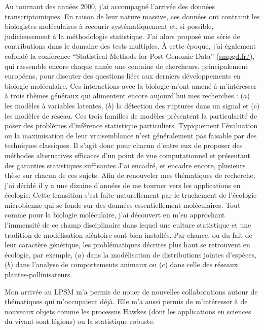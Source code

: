 Au tournant des années 2000, j'ai accompagné l'arrivée des données transcriptomiques. En raison de leur nature massive, ces données ont contraint les biologistes moléculaires à recourir systématiquement et, si possible, judicieusement à la méthodologie statistique. J'ai alors proposé une série de contributions dans le domaine des tests multiples. À cette époque, j'ai également cofondé la conférence “Statistical Methods for Post Genomic Data” (\url{smpgd.fr/}), qui rassemble encore chaque année une centaine de chercheurs, principalement européens, pour discuter des questions liées aux derniers développements en biologie moléculaire.
Ces interactions avec la biologie m'ont amené à m'intéresser à trois thèmes généraux qui alimentent encore aujourd'hui mes recherches : ($a$) les modèles à variables latentes, ($b$) la détection des ruptures dans un signal et ($c$) les modèles de réseau. 
Ces trois familles de modèles présentent la particularité de poser des problèmes d’inférence statistique particuliers. 
Typiquement l’évaluation ou la maximisation de leur vraisemblance n’est généralement pas faisable par des techniques classiques. 
Il s’agit donc pour chacun d’entre eux de proposer des méthodes alternatives efficaces d’un point de vue computationnel et présentant des garanties statistiques suffisantes 
J’ai encadré, et encadre encore, plusieurs thèse sur chacun de ces sujets.
Afin de renouveler mes thématiques de recherche, j’ai décidé il y a une dizaine d’années de me tourner vers les applications en écologie. Cette transition s’est faite naturellement par le truchement de l’écologie microbienne qui se fonde sur des données essentiellement moléculaires. Tout comme pour la biologie moléculaire, j’ai découvert en m’en approchant l’immensité de ce champ disciplinaire dans lequel une culture statistique et une tradition de modélisation aléatoire sont bien installés. Par chance, ou du fait de leur caractère générique, les problématiques décrites plus haut se retrouvent en écologie, par exemple, ($a$) dans la modélisation de distributions jointes d’espèces, ($b$) dans l’analyse de comportements animaux ou ($c$) dans celle des réseaux plantes-pollinisateurs.

Mon arrivée au LPSM m’a permis de nouer de nouvelles collaborations autour de thématiques qui m’occupaient déjà. Elle m’a aussi permis de m'intéresser à de nouveaux objets comme les processus Hawkes (dont les applications en sciences du vivant sont légions) ou la statistique robuste.

